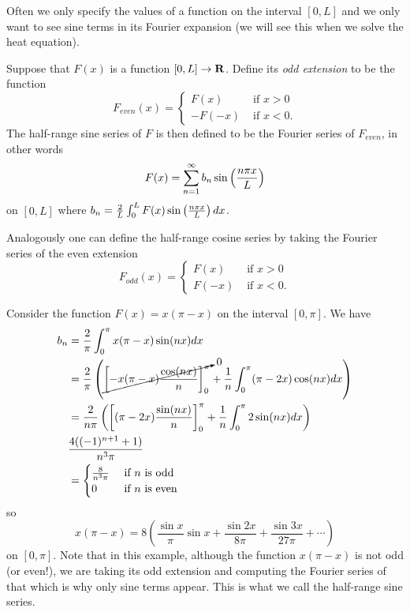 Often we only specify the values of a function on the interval $[0,L]$ and we only want to see sine terms in its Fourier expansion (we will see this when we solve the heat equation).

\begin{dfn}
Suppose that $F(x)$ is a function $[0,L]\to\mathbf{R}$. Define its {\em odd extension} to be the function
\[F_{even}(x)=\begin{cases}F(x)&\mbox{ if }x>0\\ -F(-x)&\mbox{ if }x<0.\end{cases}\]
The half-range sine series of $F$ is then defined to be the Fourier series of $F_{even}$, in other words
\[F(x)=\sum_{n=1}^{\infty}b_n\sin\left(\frac{n \pi x}{L}\right)\]
on $[0,L]$ where $b_n=\frac{2}{L}\int_0^LF(x)\sin\left(\frac{n \pi x}{L}\right)dx$.
\end{dfn}
Analogously one can define the half-range cosine series by taking the Fourier series of the even extension
\[F_{odd}(x)=\begin{cases}F(x)&\mbox{ if }x>0\\ F(-x)&\mbox{ if }x<0.\end{cases}\]

\begin{exm}\label{exm:xpiminusxsquared}
Consider the function $F(x)=x(\pi-x)$ on the interval $[0,\pi]$. We have
\begin{align*}
b_n&=\frac{2}{\pi}\int_0^{\pi}x(\pi-x)\sin(nx)dx\\
   &=\frac{2}{\pi}\left(\cancelto{0}{\left[-x(\pi-x)\frac{\cos(nx)}{n}\right]_0^{\pi}}+\frac{1}{n}\int_0^{\pi}(\pi-2x)\cos(nx)dx\right)\\
   &=\frac{2}{n\pi}\left(\left[(\pi-2x)\frac{\sin(nx)}{n}\right]_0^{\pi}+\frac{1}{n}\int_0^{\pi}2\sin(nx)dx\right)\\
   &\frac{4((-1)^{n+1}+1)}{n^3\pi}\\
   &=\begin{cases}
       \frac{8}{n^3\pi}&\mbox{ if }n\mbox{ is odd}\\
       0&\mbox{ if }n\mbox{ is even}
     \end{cases}
\end{align*}
so
\[x(\pi-x)=8\left(\frac{\sin x}{\pi}\sin x+\frac{\sin 2x}{8\pi}+\frac{\sin 3x}{27\pi}+\cdots\right)\]
on $[0,\pi]$. Note that in this example, although the function $x(\pi-x)$ is not odd (or even!), we are taking its odd extension and computing the Fourier series of that which is why only sine terms appear. This is what we call the half-range sine series.
\end{exm}

